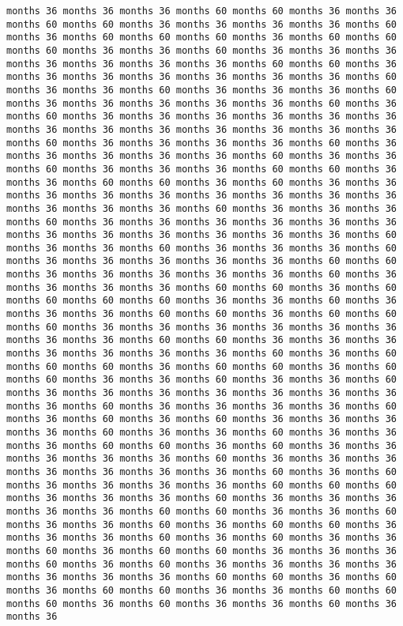 \documentclass[11pt]{article}
\begin{document}
\begin{Verbatim}[commandchars=\\\{\}, frame=single, framerule=2mm, rulecolor=\color{outerrorbackground}]
months 36 months 36 months 36 months 60 months 60 months 36 months 36 months 60 months 60 months 36 months 36 months 36 months 36 months 60 months 36 months 60 months 60 months 60 months 36 months 60 months 60 months 60 months 36 months 36 months 60 months 36 months 36 months 36 months 36 months 36 months 36 months 36 months 60 months 60 months 36 months 36 months 36 months 36 months 36 months 36 months 36 months 60 months 36 months 36 months 60 months 36 months 36 months 36 months 60 months 36 months 36 months 36 months 36 months 36 months 60 months 36 months 60 months 36 months 36 months 36 months 36 months 36 months 36 months 36 months 36 months 36 months 36 months 36 months 36 months 36 months 60 months 36 months 36 months 36 months 36 months 60 months 36 months 36 months 36 months 36 months 36 months 60 months 36 months 36 months 60 months 36 months 36 months 36 months 60 months 60 months 36 months 36 months 60 months 60 months 36 months 60 months 36 months 36 months 36 months 36 months 36 months 36 months 36 months 36 months 36 months 36 months 36 months 36 months 60 months 36 months 36 months 36 months 60 months 36 months 36 months 36 months 36 months 36 months 36 months 36 months 36 months 36 months 36 months 36 months 36 months 60 months 36 months 36 months 60 months 36 months 36 months 36 months 60 months 36 months 36 months 36 months 36 months 36 months 60 months 60 months 36 months 36 months 36 months 36 months 36 months 60 months 36 months 36 months 36 months 36 months 60 months 60 months 36 months 60 months 60 months 60 months 60 months 36 months 36 months 60 months 36 months 36 months 36 months 60 months 60 months 36 months 60 months 60 months 60 months 36 months 36 months 36 months 36 months 36 months 36 months 36 months 36 months 60 months 60 months 36 months 36 months 36 months 36 months 36 months 36 months 36 months 60 months 36 months 60 months 60 months 60 months 36 months 60 months 60 months 36 months 60 months 60 months 36 months 36 months 60 months 36 months 36 months 60 months 36 months 36 months 36 months 36 months 36 months 36 months 36 months 36 months 60 months 36 months 36 months 36 months 36 months 60 months 36 months 60 months 36 months 60 months 36 months 36 months 36 months 36 months 60 months 36 months 36 months 60 months 36 months 36 months 36 months 60 months 60 months 36 months 60 months 36 months 36 months 36 months 36 months 36 months 60 months 36 months 36 months 36 months 36 months 36 months 36 months 36 months 60 months 36 months 60 months 36 months 36 months 36 months 36 months 60 months 60 months 60 months 36 months 36 months 36 months 60 months 36 months 36 months 36 months 36 months 36 months 60 months 60 months 36 months 36 months 60 months 36 months 36 months 60 months 36 months 60 months 60 months 36 months 36 months 36 months 60 months 36 months 60 months 36 months 36 months 60 months 36 months 60 months 60 months 36 months 36 months 36 months 60 months 36 months 60 months 36 months 36 months 36 months 36 months 36 months 36 months 36 months 60 months 60 months 36 months 60 months 36 months 60 months 60 months 36 months 36 months 60 months 60 months 60 months 36 months 60 months 36 months 36 months 60 months 36 months 36 
\end{Verbatim}
\end{document}
